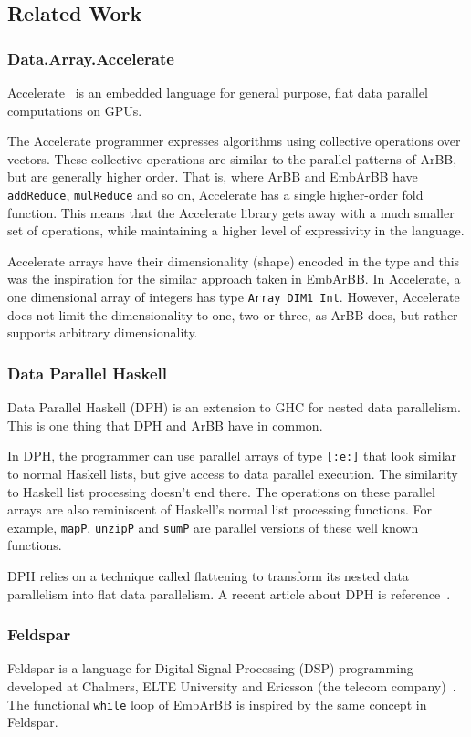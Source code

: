 
\subsection{Related Work} 
\subsubsection{Data.Array.Accelerate} 
Accelerate~\cite{ACCELERATEDAMP11} is an embedded language for general purpose, 
flat data parallel computations on GPUs. 

The Accelerate programmer expresses algorithms using collective operations 
over vectors. These collective operations are similar to the 
parallel patterns of ArBB, but are generally higher order. That is, where 
ArBB and EmbArBB have {\tt addReduce}, {\tt mulReduce} and so on, Accelerate
has a single higher-order fold function. This means that the Accelerate library
gets away with a much smaller set of operations, while maintaining a higher 
level of expressivity in the language. 

Accelerate arrays have their dimensionality (shape) encoded in the type 
and this was the inspiration for the similar approach taken in EmbArBB. In 
Accelerate, a one dimensional array of integers has type {\tt Array DIM1 Int}.
However, Accelerate does not limit the dimensionality to one, two or three,
as ArBB does, but rather supports arbitrary dimensionality.

\subsubsection{Data Parallel Haskell} 
Data Parallel Haskell (DPH) is an extension to GHC for nested data parallelism. 
This is one thing that DPH and ArBB have in common. 
 
In DPH, the programmer can use parallel arrays of type {\tt [:e:]} that look
similar to normal Haskell lists, but give access to data parallel execution.
The similarity to Haskell list processing doesn't end there. The operations 
on these parallel arrays are also reminiscent of Haskell's normal list processing functions.
For example, {\tt mapP}, {\tt unzipP} and {\tt sumP} are parallel versions of 
these well known functions. 

DPH relies on a technique called flattening to transform its nested data parallelism 
into flat data parallelism. 
A recent article about DPH is reference~\cite{DPH}. 
  
 

\subsubsection{Feldspar} 
Feldspar is a language for Digital Signal Processing (DSP) programming
developed at Chalmers, ELTE University and Ericsson 
(the telecom company)~\cite{FELDSPAR2010}. The functional {\tt while} loop 
of EmbArBB is inspired by the same concept in Feldspar. 

